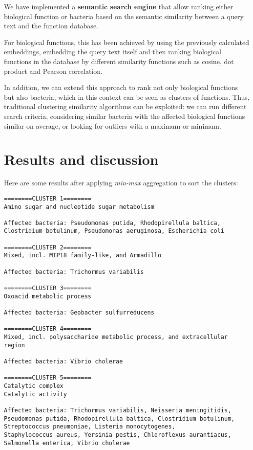 \documentclass{article}
\begin{document}
We have implemented a \textbf{semantic search engine} that allow ranking either biological function or bacteria based on the semantic similarity between a query text and the function database. 

For biological functions, this has been achieved by using the previously calculated embeddings, embedding the query text itself and then ranking biological functions in the database by different similarity functions such as cosine, dot product and Pearson correlation.

In addition, we can extend this approach to rank not only biological functions but also bacteria, which in this context can be seen as clusters of functions. Thus, traditional clustering similarity algorithms can be exploited: we can run different search criteria, considering similar bacteria with the affected biological functions similar on average, or looking for outliers with a maximum or minimum.

\section{Results and discussion}
Here are some results after applying \textit{min-max} aggregation to sort the clusters:
\begin{verbatim}
========CLUSTER 1========
Amino sugar and nucleotide sugar metabolism

Affected bacteria: Pseudomonas putida, Rhodopirellula baltica, 
Clostridium botulinum, Pseudomonas aeruginosa, Escherichia coli

========CLUSTER 2========
Mixed, incl. MIP18 family-like, and Armadillo

Affected bacteria: Trichormus variabilis

========CLUSTER 3========
Oxoacid metabolic process

Affected bacteria: Geobacter sulfurreducens

========CLUSTER 4========
Mixed, incl. polysaccharide metabolic process, and extracellular region

Affected bacteria: Vibrio cholerae

========CLUSTER 5========
Catalytic complex
Catalytic activity

Affected bacteria: Trichormus variabilis, Neisseria meningitidis, 
Pseudomonas putida, Rhodopirellula baltica, Clostridium botulinum, 
Streptococcus pneumoniae, Listeria monocytogenes, 
Staphylococcus aureus, Yersinia pestis, Chloroflexus aurantiacus, 
Salmonella enterica, Vibrio cholerae
\end{verbatim}
\end{document}
